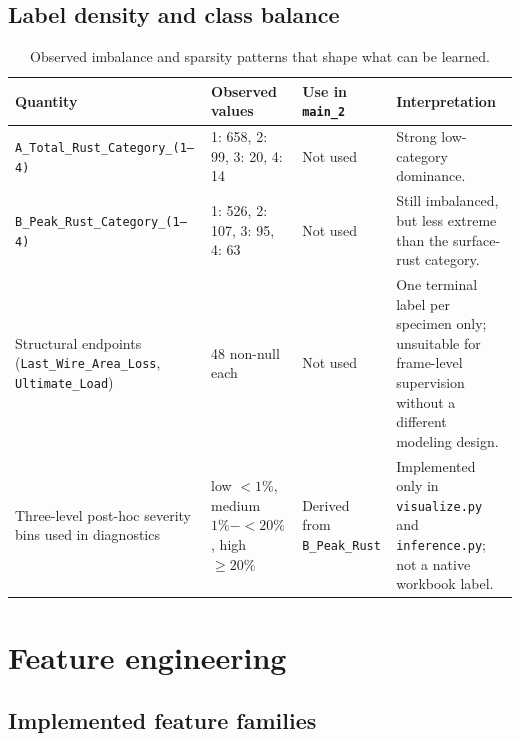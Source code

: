 \documentclass[11pt]{article}
\begin{document}
\subsection{Label density and class balance}

\begin{table}[H]
\centering
\small
\begin{tabularx}{\textwidth}{p{} p{} p{} Y}
\toprule
\textbf{Quantity} & \textbf{Observed values} & \textbf{Use in \texttt{main\_2}} & \textbf{Interpretation} \\
\midrule
\texttt{A\_Total\_Rust\_Category\_(1--4)} & 1: 658, 2: 99, 3: 20, 4: 14 & Not used & Strong low-category dominance. \\
\texttt{B\_Peak\_Rust\_Category\_(1--4)} & 1: 526, 2: 107, 3: 95, 4: 63 & Not used & Still imbalanced, but less extreme than the surface-rust category. \\
Structural endpoints (\texttt{Last\_Wire\_Area\_Loss}, \texttt{Ultimate\_Load}) & 48 non-null each & Not used & One terminal label per specimen only; unsuitable for frame-level supervision without a different modeling design. \\
Three-level post-hoc severity bins used in diagnostics & low \(<1\%\), medium \(1\%-<20\%\), high \(\geq20\%\) & Derived from \texttt{B\_Peak\_Rust} & Implemented only in \texttt{visualize.py} and \texttt{inference.py}; not a native workbook label. \\
\bottomrule
\end{tabularx}
\caption{Observed imbalance and sparsity patterns that shape what can be learned.}
\label{tab:label_balance}
\end{table}

\section{Feature engineering}

\subsection{Implemented feature families}
\end{document}
